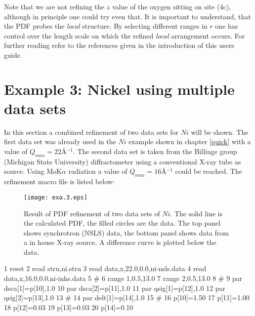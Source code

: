 \noindent Note that we are not refining the $z$ value of the
oxygen sitting on site (4c), although in principle one could try
even that. It is important to understand, that the PDF probes the
{\it local} structure. By selecting different ranges in $r$ one
has control over the length scale on which the refined {\it local}
arrangement occurs. For further reading refer to the references
given in the introduction of this users guide.


\section{Example 3: Nickel using multiple data sets\label{exa_nimul}}

In this section a combined refinement of two data sets for $Ni$
will be shown. The first data set was already used in the $Ni$
example shown in chapter \ref{quick} with a value of
$Q_{max}=22$\AA$^{-1}$. The second data set is taken from the
Billinge group (Michigan State University) diffractometer using a
conventional X-ray tube as source. Using MoK$\alpha$ radiation a
value of $Q_{max}=16$\AA$^{-1}$ could be reached. The refinement
macro file is listed below:

\begin{figure}[!tb]
   \centering
   \texttt{[image: exa.3.eps]}
   \caption[Result of PDF refinement of two data sets of $Ni$]
           {Result of PDF refinement of two data sets of $Ni$.
            The solid line is the calculated PDF, the filled circles are
            the data. The top panel shows synchrotron (NSLS) data,
            the bottom panel shows data from a in house X-ray source.
            A difference curve is plotted below the data.}
   \label{exa_fig3}
\end{figure}

\footnotesize
\begin{MacVerbatim}
      1 reset
      2 read stru,ni.stru
      3 read data,x,22.0,0.0,ni-nsls.data
      4 read data,x,16.0,0.0,ni-inhs.data
      5 #
      6 range 1,0.5,13.0
      7 range 2,0.5,13.0
      8 #
      9 par dsca[1]=p[10],1.0
     10 par dsca[2]=p[11],1.0
     11 par qsig[1]=p[12],1.0
     12 par qsig[2]=p[13],1.0
     13 #
     14 par delt[1]=p[14],1.0
     15 #
     16 p[10]=1.50
     17 p[11]=1.00
     18 p[12]=0.03
     19 p[13]=0.03
     20 p[14]=0.10
\end{MacVerbatim}
\normalsize

